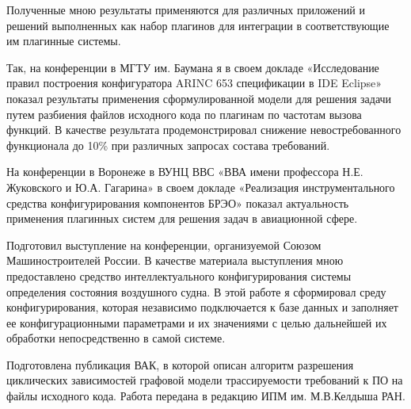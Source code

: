 
Полученные мною результаты применяются для различных приложений и решений выполненных как набор плагинов для интеграции в соответствующие им плагинные системы.

Так, на конференции в МГТУ им. Баумана я в своем докладе «Исследование правил построения конфигуратора ARINC 653 спецификации в IDE Eclipse» показал результаты применения сформулированной модели для решения задачи путем разбиения файлов исходного кода по плагинам по частотам вызова функций. В качестве результата продемонстрировал снижение невостребованного функционала до 10\% при различных запросах состава требований.

На конференции в Воронеже в ВУНЦ ВВС «ВВА имени профессора Н.Е. Жуковского и Ю.А. Гагарина» в своем докладе «Реализация инструментального средства конфигурирования компонентов БРЭО» показал актуальность применения плагинных систем для решения задач в авиационной сфере.

Подготовил выступление на конференции, организуемой Союзом Машиностроителей России. В качестве материала выступления мною предоставлено средство интеллектуального конфигурирования системы определения состояния воздушного судна. В этой работе я сформировал среду конфигурирования, которая независимо подключается к базе данных и заполняет ее конфигурационными параметрами и их значениями с целью дальнейшей их обработки непосредственно в самой системе.

Подготовлена публикация ВАК, в которой описан алгоритм разрешения циклических зависимостей графовой модели трассируемости требований к ПО на файлы исходного кода. Работа передана в редакцию ИПМ им. М.В.Келдыша РАН.

